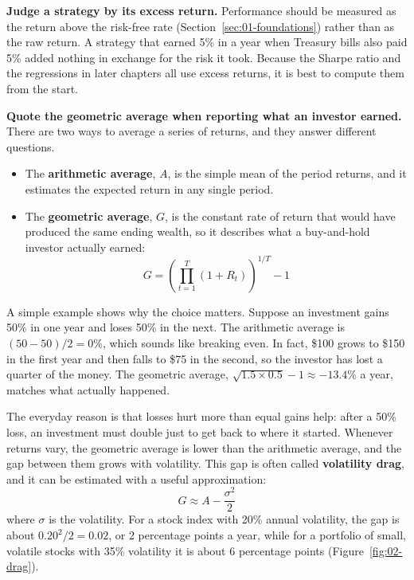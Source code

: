 \textbf{Judge a strategy by its excess return.} Performance should be measured as the return above the risk-free rate (Section~\ref{sec:01-foundations}) rather than as the raw return. A strategy that earned 5\% in a year when Treasury bills also paid 5\% added nothing in exchange for the risk it took. Because the Sharpe ratio and the regressions in later chapters all use excess returns, it is best to compute them from the start.

\textbf{Quote the geometric average when reporting what an investor earned.} There are two ways to average a series of returns, and they answer different questions.

\begin{itemize}
  \item The \textbf{arithmetic average}, $A$, is the simple mean of the period returns, and it estimates the expected return in any single period.
  \item The \textbf{geometric average}, $G$, is the constant rate of return that would have produced the same ending wealth, so it describes what a buy-and-hold investor actually earned:
  \begin{equation}
    G = \left(\prod_{t=1}^{T} (1 + R_t)\right)^{1/T} - 1
    \label{eq:02-geometric}
  \end{equation}
\end{itemize}

A simple example shows why the choice matters. Suppose an investment gains 50\% in one year and loses 50\% in the next. The arithmetic average is $(50 - 50)/2 = 0$\%, which sounds like breaking even. In fact, \$100 grows to \$150 in the first year and then falls to \$75 in the second, so the investor has lost a quarter of the money. The geometric average, $\sqrt{1.5 \times 0.5} - 1 \approx -13.4$\% a year, matches what actually happened.

The everyday reason is that losses hurt more than equal gains help: after a 50\% loss, an investment must double just to get back to where it started. Whenever returns vary, the geometric average is lower than the arithmetic average, and the gap between them grows with volatility. This gap is often called \textbf{volatility drag}, and it can be estimated with a useful approximation:
\begin{equation}
  G \approx A - \frac{\sigma^2}{2}
  \label{eq:02-drag}
\end{equation}
where $\sigma$ is the volatility. For a stock index with 20\% annual volatility, the gap is about $0.20^2/2 = 0.02$, or 2 percentage points a year, while for a portfolio of small, volatile stocks with 35\% volatility it is about 6 percentage points (Figure~\ref{fig:02-drag}).


